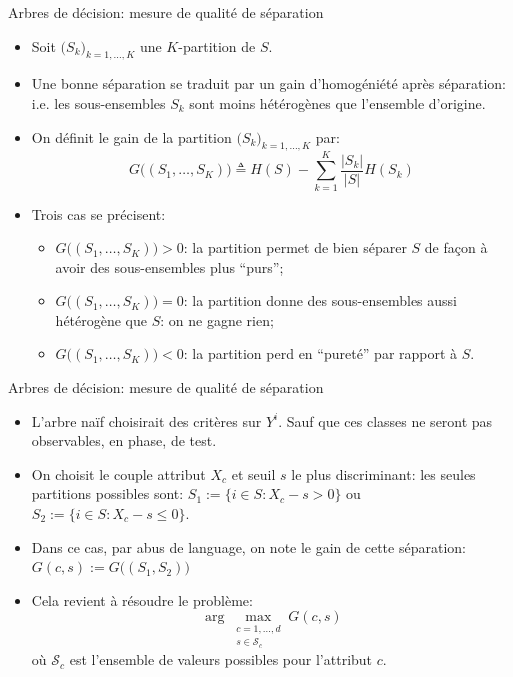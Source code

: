 \documentclass[8pt]{beamer}
\begin{document}
				\begin{frame}{Arbres de décision: mesure de qualité de séparation}
					\begin{itemize}
						\item<1-> Soit \(\big(S_k\big)_{k = 1, \dots, K}\) une \(K\)-partition de \(S\).
						\item<2-> Une bonne séparation se traduit par un gain d'homogéniété après séparation: i.e. les sous-ensembles \(S_k\) sont moins hétérogènes que l'ensemble d'origine.
						\item<3-> On définit le gain de la partition \(\big(S_k\big)_{k = 1, \dots, K}\) par:
							\begin{equation}
								G\big((S_1, \dots, S_K)\big) \triangleq H(S) - \sum_{k=1}^K \frac{\vert S_k \vert}{\vert S \vert}H(S_k)
							\end{equation}
						\item<4-> Trois cas se précisent:
							\begin{itemize}
								\item<5-> \(G\big((S_1, \dots, S_K)\big) > 0\): la partition permet de bien séparer \(S\) de façon à avoir des sous-ensembles plus ``purs'';
								\item<6-> \(G\big((S_1, \dots, S_K)\big) = 0\): la partition donne des sous-ensembles aussi hétérogène que \(S\): on ne gagne rien;
								\item<7-> \(G\big((S_1, \dots, S_K)\big) < 0\): la partition perd en ``pureté'' par rapport à \(S\).
							\end{itemize}
					\end{itemize}
				\end{frame}
				\begin{frame}{Arbres de décision: mesure de qualité de séparation}
					\begin{itemize}
						\item<1-> L'arbre naïf choisirait des critères sur \(Y^i\). Sauf que ces classes ne seront pas observables, en phase, de test.
						\item<2-> On choisit le couple attribut \(X_c\) et seuil \(s\) le plus discriminant: les seules partitions possibles sont: \(S_1 := \{i \in S: X_c - s > 0\}\) ou \(S_2 := \{i \in S: X_c - s \leq 0\}\).
						\item<3-> Dans ce cas, par abus de language, on note le gain de cette séparation: \(G(c, s) := G\big((S_1, S_2)\big)\)
						\item<4-> Cela revient à résoudre le problème:
							\begin{equation}
								\arg \max_{\substack{c=1,\dots,d\\s \in \mathscr{S}_c}} G(c, s)
							\end{equation}
							où \(\mathscr{S}_c\) est l'ensemble de valeurs possibles pour l'attribut \(c\).
					\end{itemize}
				\end{frame}
\end{document}
